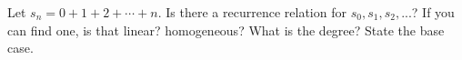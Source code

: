 
Let $s_n = 0 + 1 + 2 + \cdots + n$.
Is there a recurrence relation for $s_0, s_1, s_2, ...$?
If you can find one, is that linear? homogeneous? What is the degree?
State the base case.
